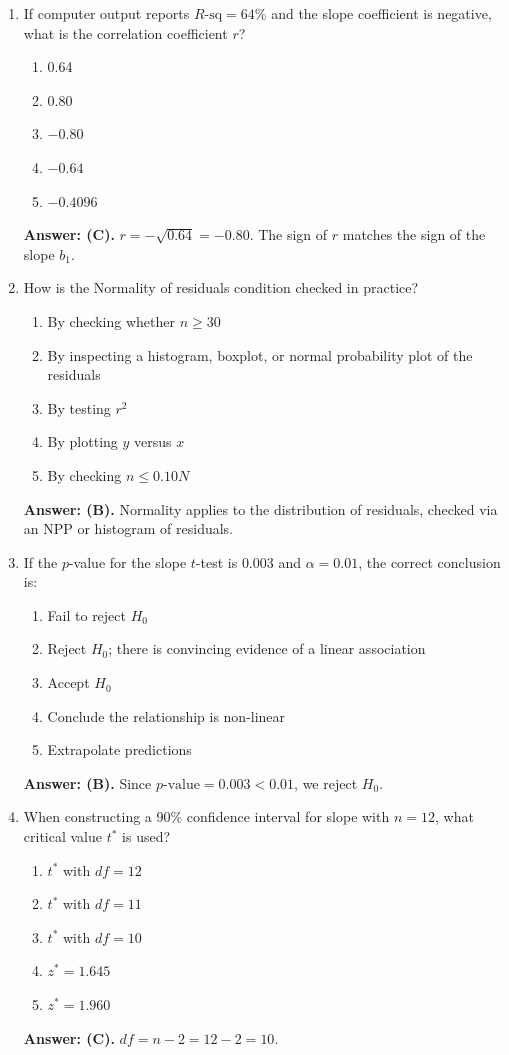 \begin{enumerate}[leftmargin=1.5em]
  \item If computer output reports $R\text{-sq} = 64\%$ and the slope coefficient is negative, what is the correlation coefficient $r$?
  \begin{enumerate}[label=(\Alph*)]
    \item 0.64 \item 0.80 \item $-0.80$ \item $-0.64$ \item $-0.4096$
  \end{enumerate}
  \textbf{Answer: (C).} $r = -\sqrt{0.64} = -0.80$. The sign of $r$ matches the sign of the slope $b_1$.

  \item How is the Normality of residuals condition checked in practice?
  \begin{enumerate}[label=(\Alph*)]
    \item By checking whether $n \ge 30$ \item By inspecting a histogram, boxplot, or normal probability plot of the residuals \item By testing $r^2$ \item By plotting $y$ versus $x$ \item By checking $n \le 0.10N$
  \end{enumerate}
  \textbf{Answer: (B).} Normality applies to the distribution of residuals, checked via an NPP or histogram of residuals.

  \item If the $p$-value for the slope $t$-test is $0.003$ and $\alpha = 0.01$, the correct conclusion is:
  \begin{enumerate}[label=(\Alph*)]
    \item Fail to reject $H_0$ \item Reject $H_0$; there is convincing evidence of a linear association \item Accept $H_0$ \item Conclude the relationship is non-linear \item Extrapolate predictions
  \end{enumerate}
  \textbf{Answer: (B).} Since $p\text{-value} = 0.003 < 0.01$, we reject $H_0$.

  \item When constructing a 90\% confidence interval for slope with $n = 12$, what critical value $t^*$ is used?
  \begin{enumerate}[label=(\Alph*)]
    \item $t^*$ with $df = 12$ \item $t^*$ with $df = 11$ \item $t^*$ with $df = 10$ \item $z^* = 1.645$ \item $z^* = 1.960$
  \end{enumerate}
  \textbf{Answer: (C).} $df = n - 2 = 12 - 2 = 10$.


\end{enumerate}
